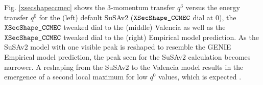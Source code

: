Fig. \ref{xsecshapeccmec} shows the $3$-momentum transfer $q^3$ versus the energy transfer $q^0$ for the (left) default SuSAv$2$ ($\verb!XSecShape_CCMEC!$ dial at $0$), the $\verb!XSecShape_CCMEC!$ tweaked dial to the (middle) Valencia as well as the $\verb!XSecShape_CCMEC!$ tweaked dial to the (right) Empirical model prediction. As the SuSAv$2$ model with one visible peak is reshaped to resemble the GENIE Empirical model prediction, the peak seen for the SuSAv$2$ calculation becomes narrower. A reshaping from the SuSAv$2$ to the Valencia model results in the emergence of a second local maximum for low $q^0$ values, which is expected \cite{PhysRevD.105.072001}. %


\vspace{-4mm}
